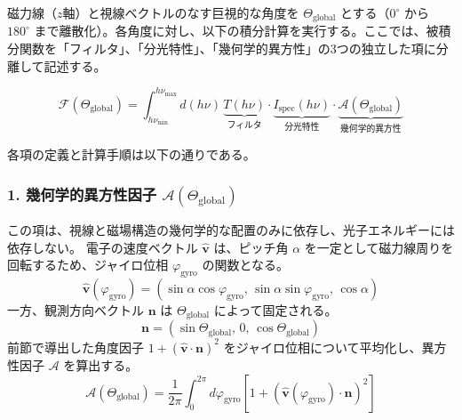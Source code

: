 \documentclass[a4paper,11pt]{bxjsarticle} %
\begin{document}
磁力線（$z$軸）と視線ベクトルのなす巨視的な角度を $\Theta_{\mathrm{global}}$ とする（$0^\circ$ から $180^\circ$ まで離散化）。各角度に対し、以下の積分計算を実行する。ここでは、被積分関数を「フィルタ」、「分光特性」、「幾何学的異方性」の3つの独立した項に分離して記述する。

\begin{equation}
    \mathcal{F}(\Theta_{\mathrm{global}}) = \int_{h\nu_{\min}}^{h\nu_{\max}} d(h\nu) \, \underbrace{T(h\nu)}_{\text{フィルタ}} \cdot \underbrace{I_{\mathrm{spec}}(h\nu)}_{\text{分光特性}} \cdot \underbrace{\mathcal{A}(\Theta_{\mathrm{global}})}_{\text{幾何学的異方性}}
\end{equation}

各項の定義と計算手順は以下の通りである。

\subsubsection{1. 幾何学的異方性因子 $\mathcal{A}(\Theta_{\mathrm{global}})$}
この項は、視線と磁場構造の幾何学的な配置のみに依存し、光子エネルギーには依存しない。
電子の速度ベクトル $\hat{\bm{v}}$ は、ピッチ角 $\alpha$ を一定として磁力線周りを回転するため、ジャイロ位相 $\varphi_{\mathrm{gyro}}$ の関数となる。
\begin{equation}
    \hat{\bm{v}}(\varphi_{\mathrm{gyro}}) = (\sin\alpha \cos\varphi_{\mathrm{gyro}}, \, \sin\alpha \sin\varphi_{\mathrm{gyro}}, \, \cos\alpha)
\end{equation}
一方、観測方向ベクトル $\bm{n}$ は $\Theta_{\mathrm{global}}$ によって固定される。
\begin{equation}
    \bm{n} = (\sin\Theta_{\mathrm{global}}, \, 0, \, \cos\Theta_{\mathrm{global}})
\end{equation}
前節で導出した角度因子 $1 + (\hat{\bm{v}} \cdot \bm{n})^2$ をジャイロ位相について平均化し、異方性因子 $\mathcal{A}$ を算出する。
\begin{equation}
    \mathcal{A}(\Theta_{\mathrm{global}}) = \frac{1}{2\pi} \int_{0}^{2\pi} d\varphi_{\mathrm{gyro}} \left[ 1 + \left( \hat{\bm{v}}(\varphi_{\mathrm{gyro}}) \cdot \bm{n} \right)^2 \right]
\end{equation}
\end{document}
